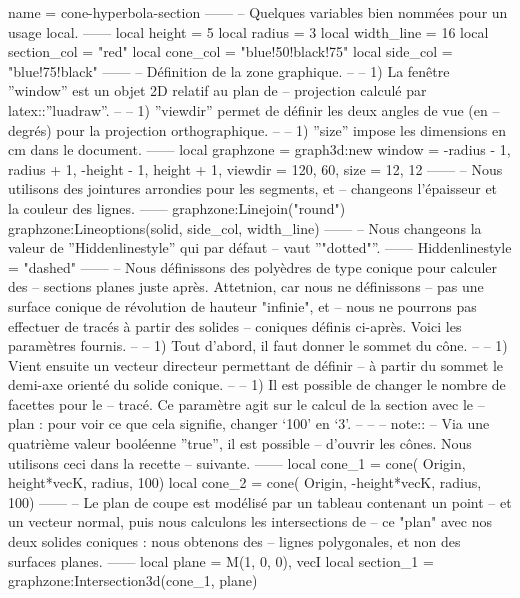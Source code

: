 \documentclass[varwidth, border = 3pt]{standalone}
\begin{document}
\begin{luadraw}{name = cone-hyperbola-section}
------
-- Quelques variables bien nommées pour un usage local.
------
    local height      =  5
    local radius      =  3
    local width_line  =  16
    local section_col = "red"
    local cone_col    = "blue!50!black!75"
    local side_col    = "blue!75!black"
------
-- Définition de la zone graphique.
--
--     1) La fenêtre ''window'' est un objet 2D relatif au plan de
--     projection calculé par latex::''luadraw''.
--
--     1) ''viewdir'' permet de définir les deux angles de vue (en
--     degrés) pour la projection orthographique.
--
--     1) ''size'' impose les dimensions en cm dans le document.
------
    local graphzone = graph3d:new{
        window  = {-radius - 1, radius + 1, -height - 1, height + 1},
        viewdir = {120, 60},
        size    = {12, 12}
    }
------
-- Nous utilisons des jointures arrondies pour les segments, et
-- changeons l'épaisseur et la couleur des lignes.
------
    graphzone:Linejoin("round")
    graphzone:Lineoptions(solid, side_col, width_line)
------
-- Nous changeons la valeur de ''Hiddenlinestyle'' qui par défaut
-- vaut ''"dotted"''.
------
    Hiddenlinestyle = "dashed"
------
-- Nous définissons des polyèdres de type conique pour calculer des
-- sections planes juste après. Attetnion, car nous ne définissons
-- pas une surface conique de révolution de hauteur "infinie", et
-- nous ne pourrons pas effectuer de tracés à partir des solides
-- coniques définis ci-après. Voici les paramètres fournis.
--
--     1) Tout d'abord, il faut donner le sommet du cône.
--
--     1) Vient ensuite un vecteur directeur permettant de définir
--     à partir du sommet le demi-axe orienté du solide conique.
--
--     1) Il est possible de changer le nombre de facettes pour le
--     tracé. Ce paramètre agit sur le calcul de la section avec le
--     plan : pour voir ce que cela signifie, changer `100' en `3'.
--
--
-- note::
--     Via une quatrième valeur booléenne ''true'', il est possible
--     d'ouvrir les cônes. Nous utilisons ceci dans la recette
--     suivante.
------
    local cone_1 = cone(
        Origin, height*vecK, radius,
        100)
    local cone_2 = cone(
        Origin,  -height*vecK, radius,
        100)
------
-- Le plan de coupe est modélisé par un tableau contenant un point
-- et un vecteur normal, puis nous calculons les intersections de
-- ce "plan" avec nos deux solides coniques : nous obtenons des
-- lignes polygonales, et non des surfaces planes.
------
    local plane     = {M(1, 0, 0), vecI}
    local section_1 = graphzone:Intersection3d(cone_1, plane)

\end{luadraw}
\end{document}
